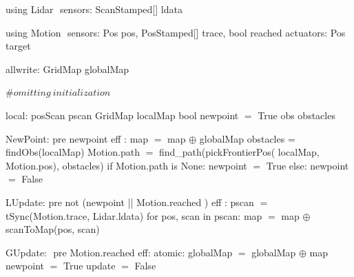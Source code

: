 using Lidar $\label{lidardef}$
    sensors:
       ScanStamped[] ldata

using Motion $\label{moddef}$
    sensors:
        Pos pos,
        PosStamped[] trace,
        bool reached
    actuators:
        Pos target

allwrite:$\label{awvar}$
    GridMap globalMap

#$\mathit{omitting\ initialization}$

local:
   posScan pscan
   GridMap localMap
   bool newpoint $=$ True
   obs obstacles

NewPoint:$\label{newpt}$
  pre newpoint
  eff : map $=$ map $\oplus$ globalMap
        obstacles = findObs(localMap)
        Motion.path $=$ find_path(pickFrontierPos(
                              localMap, Motion.pos), obstacles)
        if Motion.path is None:
           newpoint $=$ True
        else:
           newpoint $=$ False

LUpdate:$\label{lup}$
   pre not (newpoint || Motion.reached )
   eff : pscan $=$ tSync(Motion.trace, Lidar.ldata)
         for pos, scan in pscan:
             map $=$ map $\oplus$ scanToMap(pos, scan)

GUpdate: $\label{gup}$
  pre Motion.reached
  eff: atomic:
           globalMap $=$ globalMap $\oplus$ map
        newpoint $=$ True
        update $=$ False